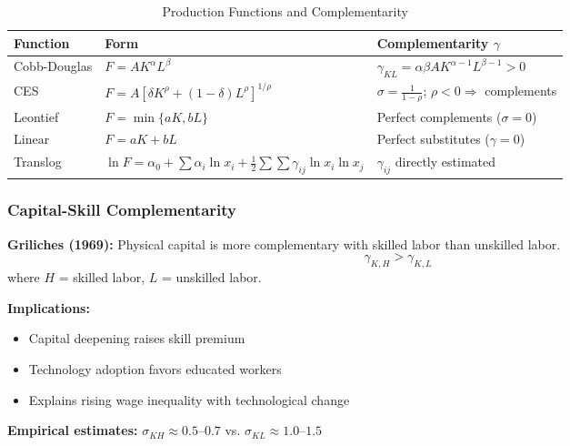 \begin{table}[h]
\centering
\caption{Production Functions and Complementarity}
\label{tab:production-gamma}
\renewcommand{\arraystretch}{1.3}
\begin{tabular}{@{}lll@{}}
\toprule
\textbf{Function} & \textbf{Form} & \textbf{Complementarity $\gamma$} \\
\midrule
Cobb-Douglas & $F = A K^\alpha L^\beta$ & $\gamma_{KL} = \alpha\beta A K^{\alpha-1} L^{\beta-1} > 0$ \\
CES & $F = A[\delta K^\rho + (1-\delta)L^\rho]^{1/\rho}$ & $\sigma = \frac{1}{1-\rho}$; $\rho < 0 \Rightarrow$ complements \\
Leontief & $F = \min\{aK, bL\}$ & Perfect complements ($\sigma = 0$) \\
Linear & $F = aK + bL$ & Perfect substitutes ($\gamma = 0$) \\
Translog & $\ln F = \alpha_0 + \sum \alpha_i \ln x_i + \frac{1}{2}\sum\sum \gamma_{ij} \ln x_i \ln x_j$ & $\gamma_{ij}$ directly estimated \\
\bottomrule
\end{tabular}
\end{table}

\subsubsection{Capital-Skill Complementarity}

\begin{tcolorbox}[colback=green!5!white,colframe=green!75!black,title=\textbf{Classic Finding: Capital-Skill Complementarity}]
\textbf{Griliches (1969):} Physical capital is more complementary with skilled labor than unskilled labor.
\begin{equation}
\gamma_{K,H} > \gamma_{K,L}
\end{equation}
where $H$ = skilled labor, $L$ = unskilled labor.

\textbf{Implications:}
\begin{itemize}[noitemsep]
    \item Capital deepening raises skill premium
    \item Technology adoption favors educated workers
    \item Explains rising wage inequality with technological change
\end{itemize}

\textbf{Empirical estimates:} $\sigma_{KH} \approx 0.5$--$0.7$ vs. $\sigma_{KL} \approx 1.0$--$1.5$
\end{tcolorbox}

